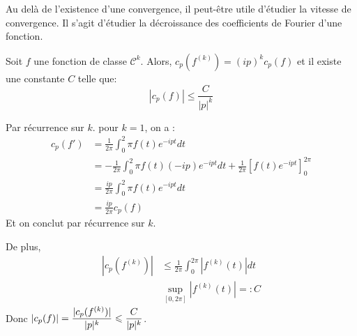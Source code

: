 	
			
	Au delà de l'existence d'une convergence, il peut-être utile d'étudier la vitesse de convergence. Il s'agit d'étudier la décroissance des coefficients de Fourier d'une fonction. 
	
	\begin{mythm}
		Soit $f$ une fonction de classe $\mathcal{C}^k$. Alors, $c_p(f^{(k)}) = (ip)^kc_p(f)$ et il existe une constante $C$ telle que:
			$$ | c_p(f) | \leqslant \frac{C}{|p|^k} $$
	\end{mythm}
	
	\begin{myproof}
		Par récurrence sur $k$. 
		pour $k=1$, on a :
			\begin{align*}
			c_p(f') &= \frac{1}{2\pi}\int_0^2\pi f(t)e^{-ipt}dt \\
					&= -\frac{1}{2\pi}\int_0^2\pi f(t)(-ip) e^{-ipt}dt + \frac{1}{2\pi}\left[f(t)e^{-ipt} \right]_0^{2\pi} \\
					& = \frac {ip}{2\pi} \int_0^2\pi f(t)e^{-ipt}dt \\
					& = \frac {ip}{2\pi} c_p(f)
			\end{align*}
			Et on conclut par récurrence sur $k$.
		
		De plus, 
		\begin{align*}
		|c_p(f^{(k)})| &\leqslant \frac{1}{2\pi}\int_0^{2\pi}|f^{(k)}(t)|dt \\
		& \sup_{[0, 2\pi]} |f^{(k)}(t)| =: C 
		\end{align*}
		Donc $ \displaystyle|c_p(f)| = \frac {|c_p(f^{(k)})|}{|p|^k} \leqslant \frac{C}{|p|^k} $.
		\cqfd		
	\end{myproof}
		
	
	\newpage
	
